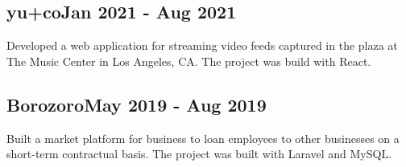 \documentclass[a4paper, 12pt]{article}
\begin{document}
\subsection {{yu+co}\hfill Jan 2021 - Aug 2021}
Developed a web application for streaming video feeds captured in the plaza at The Music Center in Los Angeles, CA\@. The project was build with React.

\vspace*{6pt}
\subsection {{Borozoro}\hfill May 2019 - Aug 2019}
\vspace*{5pt}
Built a market platform for business to loan employees to other businesses on a short-term contractual basis. The project was built with Laravel and MySQL\@.
\end{document}
